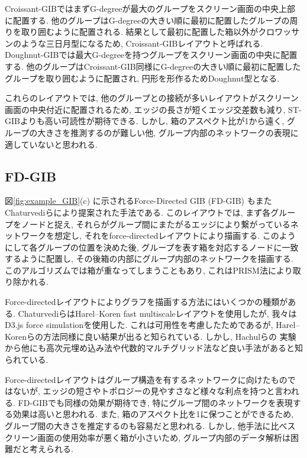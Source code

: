 \documentclass{kuee}
\begin{document}
Croissant-GIBではまずG-degreeが最大のグループをスクリーン画面の中央上部に配置する.
他のグループはG-degreeの大きい順に最初に配置したグループの周りを取り囲むように配置される.
結果として最初に配置した箱以外がクロワッサンのような三日月型になるため, Croissant-GIBレイアウトと呼ばれる.
Doughnut-GIBでは最大G-degreeを持つグループをスクリーン画面の中央に配置する.
他のグループはCroissant-GIB同様にG-degreeの大きい順に最初に配置したグループを取り囲むように配置され, 円形を形作るためDoughnut型となる.

これらのレイアウトでは, 他のグループとの接続が多いレイアウトがスクリーン画面の中央付近に配置されるため, エッジの長さが短くエッジ交差数も減り, ST-GIBよりも高い可読性が期待できる.
しかし, 箱のアスペクト比が1から遠く, グループの大きさを推測するのが難しい他, グループ内部のネットワークの表現に適していないと思われる.

\subsection{FD-GIB}
図\ref{fig:example_GIB}(c) に示されるForce-Directed GIB (FD-GIB) もまたChaturvediら\cite{chaturvedi2014group}により提案された手法である.
このレイアウトでは, まず各グループをノードと捉え, それらがグループ間にまたがるエッジにより繋がっているネットワークを想定し, それをforce-directedレイアウトにより描画する.
このようにして各グループの位置を決めた後, グループを表す箱を対応するノードに一致するように配置し,
その後箱の内部にグループ内部のネットワークを描画する.
このアルゴリズムでは箱が重なってしまうこともあり, これはPRISM法により取り除かれる\cite{gansner2008efficient}.

Force-directedレイアウトによりグラフを描画する方法にはいくつかの種類がある.
ChaturvediらはHarel--Koren fast multiscaleレイアウト\cite{harel2002graph}を使用したが, 我々はD3.js force simulation\cite{Bostock:2011:DDD:2068462.2068631}を使用した.
これは可用性を考慮したためであるが, Harel--Korenらの方法同様に良い結果が出ると知られている.
しかし, Hachulらの
実験\cite{Hachul:2005:ECF:2102325.2102348}から他にも高次元埋め込み法\cite{harel2002graph}や代数的マルチグリッド法\cite{koren2003drawing}など良い手法があると知られている.

Force-directedレイアウトはグループ構造を有するネットワークに向けたものではないが, エッジの短さやトポロジーの見やすさなど様々な利点を持つと言われる\cite{Kobourov2013ForceDirectedDA}.
FD-GIBでも同様の効果が期待でき, 特にグループ間のネットワークを表現する効果は高いと思われる.
また, 箱のアスペクト比を1に保つことができるため, グループ間の大きさを推定するのも容易だと思われる.
しかし, 他手法に比べスクリーン画面の使用効率が悪く箱が小さいため, グループ内部のデータ解析は困難だと考えられる.
\end{document}
